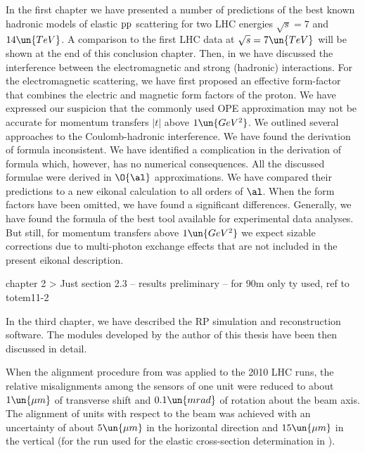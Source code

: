\def\CaptionPrefix{C.}

In the first chapter we have presented a number of predictions of the best known hadronic models of elastic $\rm pp$ scattering for two LHC energies $\sqrt s = 7$ and $14\un{TeV}$. A comparison to the first LHC data at $\sqrt s = 7\un{TeV}$ will be shown at the end of this conclusion chapter. Then, in  we have discussed the interference between the electromagnetic and strong (hadronic) interactions. For the electromagnetic scattering, we have first proposed an effective form-factor that combines the electric and magnetic form factors of the proton. We have expressed our suspicion that the commonly used OPE approximation may not be accurate for momentum transfers $|t|$ above $1\un{GeV^2}$. We outlined several approaches to the Coulomb-hadronic interference. We have found the derivation of \WaY{} formula inconsistent. We have identified a complication in the derivation of \KaL{} formula which, however, has no numerical consequences. All the discussed formulae were derived in $\O{\al}$ approximations. We have compared their predictions to a new eikonal calculation to all orders of $\al$. When the form factors have been omitted, we have found a significant differences. Generally, we have found the formula of \KaL{} the best tool available for experimental data analyses. But still, for momentum transfers above $1\un{GeV^2}$ we expect sizable corrections due to multi-photon exchange effects that are not included in the present eikonal description.

\> chapter 2
\>> Just section 2.3 -- results preliminary -- for 90m only ty used, ref to totem11-2

In the third chapter, we have described the RP simulation and reconstruction software. The modules developed by the author of this thesis have been then discussed in detail.

When the alignment procedure from  was applied to the 2010 LHC runs, the relative misalignments among the sensors of one unit were reduced to about $1\un{\mu m}$ of transverse shift and $0.1\un{mrad}$ of rotation about the beam axis. The alignment of units with respect to the beam was achieved with an uncertainty of about $5\un{\mu m}$ in the horizontal direction and $15\un{\mu m}$ in the vertical (for the run used for the elastic cross-section determination in ).

